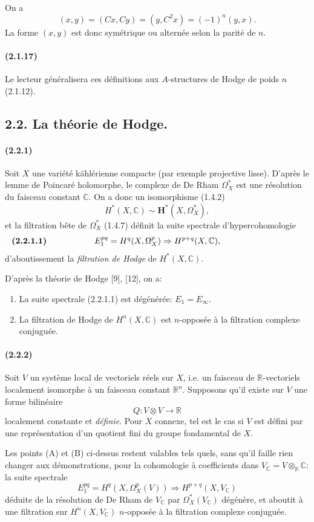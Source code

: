\documentclass[10pt]{article}
\newcommand{\C}{\mathbb C}
\newcommand{\R}{\mathbb R}
\begin{document}
On a
\[
(x,y)=(Cx,Cy)=(y,C^2x)=(-1)^n(y,x).
\]
La forme $(x,y)$ est donc symétrique ou alternée selon la parité de $n$.

\paragraph{(2.1.17)} Le lecteur généralisera ces définitions aux $A$-structures de Hodge de poids $n$ (2.1.12).

\subsection*{2.2. La théorie de Hodge.}

\paragraph{(2.2.1)} Soit $X$ une variété kählérienne compacte (par exemple projective lisse). D'après le lemme de Poincaré holomorphe, le complexe de De Rham $\Omega_X^*$ est une résolution du faisceau constant $\C$. On a donc un isomorphisme (1.4.2)
\[
H^*(X,\C)\sim\mathbf H^*(X,\Omega_X^*),
\]
et la filtration bête de $\Omega_X^*$ (1.4.7) définit la suite spectrale d'hypercohomologie
\[
\makebox[\textwidth][s]{\textbf{(2.2.1.1)}\hfill$\displaystyle E_1^{pq}=H^q(X,\Omega_X^p)\Rightarrow H^{p+q}(X,\C),$\hfill\phantom{\textbf{(2.2.1.1)}}}
\]
d'aboutissement la \emph{filtration de Hodge} de $H^*(X,\C)$.

D'après la théorie de Hodge [9], [12], on a:
\begin{enumerate}[label=(\Alph*)]
\item La suite spectrale (2.2.1.1) est dégénérée: $E_1=E_\infty$.
\item La filtration de Hodge de $H^n(X,\C)$ est $n$-opposée à la filtration complexe conjuguée.
\end{enumerate}

\paragraph{(2.2.2)} Soit $V$ un système local de vectoriels réels sur $X$, i.e. un faisceau de $\R$-vectoriels localement isomorphe à un faisceau constant $\R^n$. Supposons qu'il existe sur $V$ une forme bilinéaire
\[
Q:V\otimes V\longrightarrow\R
\]
localement constante et \emph{définie}. Pour $X$ connexe, tel est le cas si $V$ est défini par une représentation d'un quotient fini du groupe fondamental de $X$.

Les points (A) et (B) ci-dessus restent valables tels quels, sans qu'il faille rien changer aux démonstrations, pour la cohomologie à coefficients dans $V_\C=V\otimes_\R\C$: la suite spectrale
\[
E_1^{pq}=H^q(X,\Omega_X^p(V))\Rightarrow H^{p+q}(X,V_\C)
\]
déduite de la résolution de De Rham de $V_\C$ par $\Omega_X^*(V_\C)$ dégénère, et aboutit à une filtration sur $H^n(X,V_\C)$ $n$-opposée à la filtration complexe conjuguée.
\end{document}
